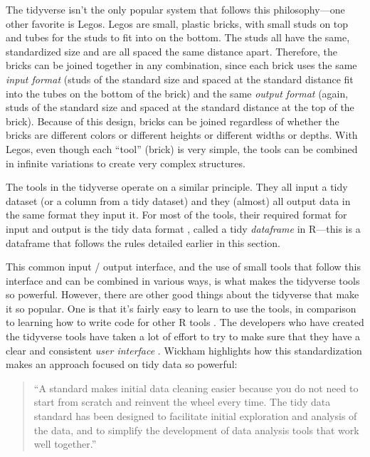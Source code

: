 \documentclass[]{tufte-book}
\begin{document}
The tidyverse isn't the only popular system that follows this
philosophy---one other favorite is Legos. Legos are small, plastic bricks, with
small studs on top and tubes for the studs to fit into on the bottom. The studs
all have the same, standardized size and are all spaced the same distance apart.
Therefore, the bricks can be joined together in any combination, since each
brick uses the same \emph{input format} (studs of the standard size and spaced at the
standard distance fit into the tubes on the bottom of the brick) and the same
\emph{output format} (again, studs of the standard size and spaced at the standard
distance at the top of the brick). Because of this design, bricks can be joined
regardless of whether the bricks are different colors or different heights or
different widths or depths. With Legos, even though each ``tool'' (brick) is very
simple, the tools can be combined in infinite variations to create very complex
structures.

The tools in the tidyverse operate on a similar principle. They all input a
tidy dataset (or a column from a tidy dataset) and they (almost) all output data
in the same format they input it. For most of the tools, their required format
for input and output is the tidy data format \citep{wickham2014tidy}, called a tidy
\emph{dataframe} in R---this is a dataframe that follows the rules detailed earlier
in this section.

This common input / output interface, and the use of small tools that follow
this interface and can be combined in various ways, is what makes the tidyverse
tools so powerful. However, there are other good things about the tidyverse that
make it so popular. One is that it's fairly easy to learn to use the tools, in
comparison to learning how to write code for other R tools \citep{robinson2017teach, peng2018teaching}. The developers who have created the tidyverse tools have
taken a lot of effort to try to make sure that they have a clear and consistent
\emph{user interface} \citep{wickham2017tidy, bryan2017data}. Wickham highlights how this
standardization makes an approach focused on tidy data so powerful:

\begin{quote}
``A standard makes initial data cleaning easier because you do not need to
start from scratch and reinvent the wheel every time. The tidy data standard has
been designed to facilitate initial exploration and analysis of the data, and to
simplify the development of data analysis tools that work well together.''
\citep{wickham2014tidy}
\end{quote}
\end{document}
